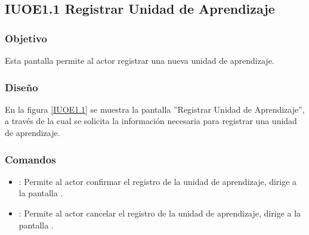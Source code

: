 \subsection{IUOE1.1 Registrar Unidad de Aprendizaje}

\subsubsection{Objetivo}
	Esta pantalla permite al actor registrar una nueva unidad de aprendizaje.

\subsubsection{Diseño}

    En la figura \ref{IUOE1.1} se muestra la pantalla ''Registrar Unidad de Aprendizaje'', a través de la cual se solicita la información necesaria para registrar una unidad de aprendizaje.
 

\subsubsection{Comandos}
    \begin{itemize}
	\item {}: Permite al actor confirmar el registro de la unidad de aprendizaje, dirige a la pantalla .
	
	\item {}: Permite al actor cancelar el registro de la unidad de aprendizaje, dirige a la pantalla .
    \end{itemize}
